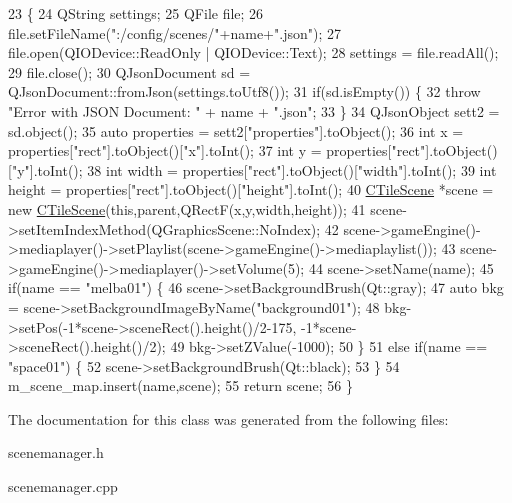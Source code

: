 \begin{DoxyCode}
23                                                                          \{
24     QString settings;
25     QFile file;
26     file.setFileName(\textcolor{stringliteral}{":/config/scenes/"}+name+\textcolor{stringliteral}{".json"});
27     file.open(QIODevice::ReadOnly | QIODevice::Text);
28     settings = file.readAll();
29     file.close();
30     QJsonDocument sd = QJsonDocument::fromJson(settings.toUtf8());
31     \textcolor{keywordflow}{if}(sd.isEmpty()) \{
32         \textcolor{keywordflow}{throw} \textcolor{stringliteral}{"Error with JSON Document: "} + name + \textcolor{stringliteral}{".json"};
33     \}
34     QJsonObject sett2 = sd.object();
35     \textcolor{keyword}{auto} properties = sett2[\textcolor{stringliteral}{"properties"}].toObject();
36     \textcolor{keywordtype}{int} x = properties[\textcolor{stringliteral}{"rect"}].toObject()[\textcolor{stringliteral}{"x"}].toInt();
37     \textcolor{keywordtype}{int} y = properties[\textcolor{stringliteral}{"rect"}].toObject()[\textcolor{stringliteral}{"y"}].toInt();
38     \textcolor{keywordtype}{int} width = properties[\textcolor{stringliteral}{"rect"}].toObject()[\textcolor{stringliteral}{"width"}].toInt();
39     \textcolor{keywordtype}{int} height = properties[\textcolor{stringliteral}{"rect"}].toObject()[\textcolor{stringliteral}{"height"}].toInt();
40     \hyperlink{class_c_tile_scene}{CTileScene} *scene = \textcolor{keyword}{new} \hyperlink{class_c_tile_scene}{CTileScene}(\textcolor{keyword}{this},parent,QRectF(x,y,width,height));
41     scene->setItemIndexMethod(QGraphicsScene::NoIndex);
42     scene->gameEngine()->mediaplayer()->setPlaylist(scene->gameEngine()->mediaplaylist());
43     scene->gameEngine()->mediaplayer()->setVolume(5);
44     scene->setName(name);
45     \textcolor{keywordflow}{if}(name == \textcolor{stringliteral}{"melba01"}) \{
46         scene->setBackgroundBrush(Qt::gray);
47         \textcolor{keyword}{auto} bkg = scene->setBackgroundImageByName(\textcolor{stringliteral}{"background01"});
48         bkg->setPos(-1*scene->sceneRect().height()/2-175, -1*scene->sceneRect().height()/2);
49         bkg->setZValue(-1000);
50     \}
51     \textcolor{keywordflow}{else} \textcolor{keywordflow}{if}(name == \textcolor{stringliteral}{"space01"}) \{
52         scene->setBackgroundBrush(Qt::black);
53     \}
54     m\_scene\_map.insert(name,scene);
55     \textcolor{keywordflow}{return} scene;
56 \}
\end{DoxyCode}


The documentation for this class was generated from the following files\+:\begin{DoxyCompactItemize}
\item 
scenemanager.\+h\item 
scenemanager.\+cpp\end{DoxyCompactItemize}
